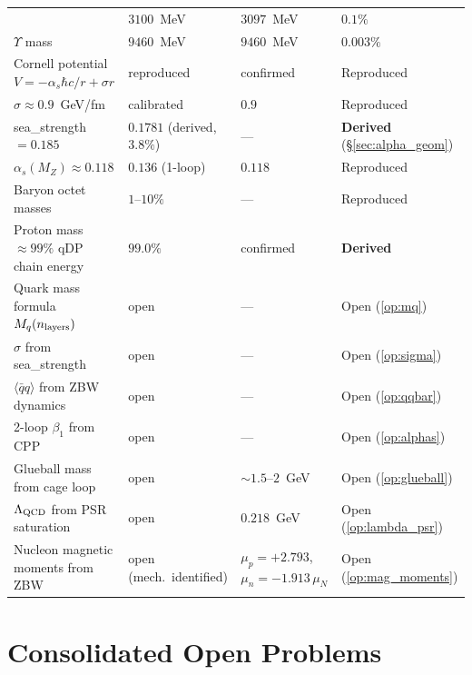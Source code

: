 \documentclass[11pt,a4paper]{article}
\newcommand{\as}{\alpha_s}
\newcommand{\qqbar}{\langle\bar{q}q\rangle}
\begin{document}
\begin{longtable}{@{}p{5.5cm}p{2.5cm}p{2.5cm}l@{}}
  & $3100$~MeV & $3097$~MeV & $0.1\%$ \\
$\Upsilon$ mass
  & $9460$~MeV & $9460$~MeV & $0.003\%$ \\
Cornell potential $V=-\as\hbar c/r+\sigma r$
  & reproduced & confirmed & Reproduced \\
$\sigma \approx 0.9$~GeV/fm
  & calibrated & $0.9$ & Reproduced \\
sea\_strength $= 0.185$
  & $0.1781$ (derived, $3.8\%$) & --- & \textbf{Derived} (\S\ref{sec:alpha_geom}) \\
$\as(M_Z) \approx 0.118$
  & $0.136$ (1-loop) & $0.118$ & Reproduced \\
Baryon octet masses
  & $1\text{--}10\%$ & --- & Reproduced \\
Proton mass $\approx99\%$ qDP chain energy
  & $99.0\%$ & confirmed & \textbf{Derived} \\
Quark mass formula $M_q(n_{\rm layers})$
  & open & --- & Open (\ref{op:mq}) \\
$\sigma$ from sea\_strength
  & open & --- & Open (\ref{op:sigma}) \\
$\qqbar$ from ZBW dynamics
  & open & --- & Open (\ref{op:qqbar}) \\
2-loop $\beta_1$ from CPP
  & open & --- & Open (\ref{op:alphas}) \\
Glueball mass from cage loop
  & open & $\sim1.5\text{--}2$~GeV & Open (\ref{op:glueball}) \\
$\Lambda_{\rm QCD}$ from PSR saturation
  & open & $0.218$~GeV & Open (\ref{op:lambda_psr}) \\
Nucleon magnetic moments from ZBW
  & open (mech.\ identified) & $\mu_p=+2.793$, $\mu_n=-1.913\,\mu_N$ & Open (\ref{op:mag_moments}) \\
\end{longtable}

\section{Consolidated Open Problems}
\label{sec:openproblems}
\end{document}

